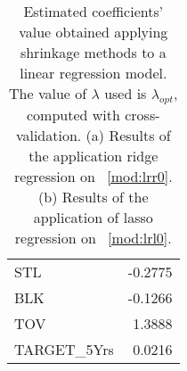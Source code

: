 \begin{table}[h]
\begin{subtable}{0.4\textwidth}
{\begin{tabular}{|| l | r ||}
			STL & -0.2775 \\
			BLK & -0.1266 \\
			TOV & 1.3888 \\ 
			TARGET\_5Yrs & 0.0216 \\				
			\hline
		\end{tabular}%
		}	
		\caption{}
		\label{table:FinalLassoCoef}
	\end{subtable}
	\caption{Estimated coefficients' value obtained applying shrinkage methods to a linear regression model. The value of $\lambda$ used is $\lambda_{opt}$, computed with cross-validation. (a) Results of the application ridge regression on \Mod~\ref{mod:lrr0}. (b) Results of the application of lasso regression on \Mod~\ref{mod:lrl0}.}
	\label{table:RegModSum}
\end{table}

\clearpage